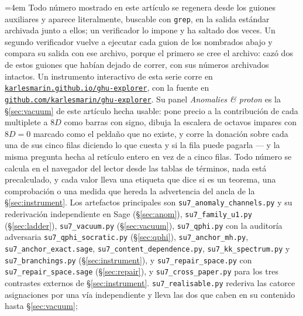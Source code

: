 \documentclass[11pt,a4paper]{article}
\begin{document}
\begingroup\raggedright\sloppy\emergencystretch=4em
Todo número mostrado en este artículo se regenera desde los guiones auxiliares y aparece
literalmente, buscable con \texttt{grep}, en la salida estándar archivada junto a ellos; un
verificador lo impone y ha saltado dos veces. Un segundo verificador vuelve a ejecutar cada guion
de los nombrados abajo y compara su salida con ese archivo, porque el primero se cree el archivo:
cazó dos de estos guiones que habían dejado de correr, con sus números archivados intactos.
Un instrumento interactivo de esta serie corre en
\href{https://karlesmarin.github.io/ghu-explorer/}{\texttt{karlesmarin.github.io/ghu-explorer}},
con la fuente en \href{https://github.com/karlesmarin/ghu-explorer}{\texttt{github.com/karlesmarin/ghu-explorer}}. Su panel \emph{Anomalies \& proton} es la
\S\ref{sec:vacuum} de este artículo hecha usable: pone precio a la contribución de cada multiplete
a $8D$ como barras con signo, dibuja la escalera de octavos impares con $8D=0$ marcado como el
peldaño que no existe, y corre la donación sobre cada una de sus cinco filas diciendo lo que cuesta
y si la fila puede pagarla --- y la misma pregunta hecha al retículo entero en vez de a cinco
filas. Todo número se calcula en el navegador del lector desde las tablas de términos, nada está
precalculado, y cada valor lleva una etiqueta que dice si es un teorema, una comprobación o una
medida que hereda la advertencia del ancla de la \S\ref{sec:instrument}. Los artefactos principales son
\texttt{su7\_\allowbreak anomaly\_\allowbreak channels.py} y su rederivación independiente en Sage
(\S\ref{sec:anom}), \texttt{su7\_\allowbreak family\_\allowbreak u1.py} (\S\ref{sec:ladder}),
\texttt{su7\_\allowbreak vacuum.py} (\S\ref{sec:vacuum}), \texttt{su7\_\allowbreak qphi.py} con la auditoría
adversaria \texttt{su7\_\allowbreak qphi\_\allowbreak socratic.py} (\S\ref{sec:qphi}),
\texttt{su7\_\allowbreak anchor\_\allowbreak mh.py}, \texttt{su7\_\allowbreak anchor\_\allowbreak exact.sage},
\texttt{su7\_\allowbreak content\_\allowbreak dependence.py}, \texttt{su7\_\allowbreak kk\_\allowbreak spectrum.py} y
\texttt{su7\_\allowbreak branchings.py} (\S\ref{sec:instrument}), y \texttt{su7\_\allowbreak repair\_\allowbreak space.py}
con \texttt{su7\_\allowbreak repair\_\allowbreak space.\allowbreak sage} (\S\ref{sec:repair}), y
\texttt{su7\_\allowbreak cross\_\allowbreak paper.py} para los tres contrastes externos de
\S\ref{sec:instrument}. \texttt{su7\_\allowbreak realisable.py} rederiva las catorce asignaciones por una
vía independiente y lleva las dos que caben en su contenido hasta \S\ref{sec:vacuum};
\end{document}
